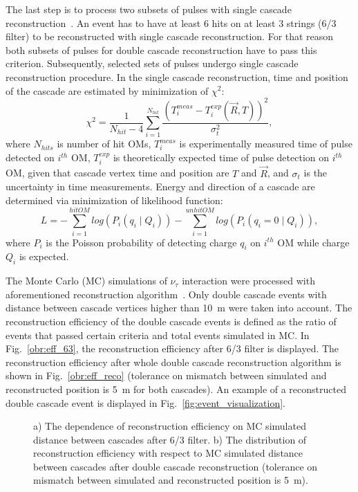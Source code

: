 \documentclass[a4paper,11pt]{article}
\begin{document}
The last step is to process two subsets of pulses with single cascade reconstruction~\cite{ICRC2019:cascades}. An event has to have at least 6 hits on at least 3 strings (6/3 filter) to be reconstructed with single cascade reconstruction. For that reason both subsets of pulses for double cascade reconstruction have to pass this criterion. Subsequently, selected sets of pulses undergo single cascade reconstruction procedure. In the single cascade reconstruction, time and position of the cascade are estimated by minimization of $\chi^{2}$:
\begin{equation}
\chi^2 = \frac{1}{N_{hit} - 4} \sum\limits_{i = 1}^{N_{hit}} \frac{ ( T_i^{meas} - T_i^{exp}(\vec{R},T))^2}{\sigma_t^2},
\label{eq:chi2}
\end{equation}
where $N_{hits}$ is number of hit OMs, $T_{i}^{meas}$ is experimentally measured time of pulse detected on $i^{th}$ OM, $T_{i}^{exp}$ is theoretically expected time of pulse detection on $i^{th}$ OM, given that cascade vertex time and position are $T$ and $\vec{R}$, and $\sigma_t$ is the uncertainty in time measurements. Energy and direction of a cascade are determined via minimization of likelihood function:
\begin{equation}
L =- \sum_{i=1}^{hit OM} log (P_{i}(q_{i} \mid Q_{i})) - \sum_{i = 1}^{unhitOM} log (P_{i}(q_{i} = 0 \mid Q_{i})),
\label{eq:likelihood}
\end{equation}
where $P_{i}$ is the Poisson probability of detecting charge $q_{i}$ on $i^{th}$ OM while charge $Q_{i}$ is expected. 

The Monte Carlo (MC) simulations of $\nu_{\tau}$ interaction were processed with aforementioned reconstruction algorithm~\cite{parallel}. Only double cascade events with distance between cascade vertices higher than 10~m were taken into account. 
The reconstruction efficiency of the double cascade events is defined as the ratio of events that passed certain criteria and total events simulated in MC. In Fig.~\ref{obr:eff_63}, the reconstruction efficiency after 6/3 filter is displayed. The reconstruction efficiency after whole double cascade reconstruction algorithm is shown in Fig.~\ref{obr:eff_reco} (tolerance on mismatch between simulated and reconstructed position is 5~m for both cascades). An example of a reconstructed double cascade event is displayed in Fig.~\ref{fig:event_visualization}. 


\begin{figure}[h!]
	\centering
	\begin{multicols}{2}
		\centering
	\end{multicols}
	\caption{a) The dependence of reconstruction efficiency on MC simulated distance between cascades after 6/3 filter. b) The distribution of reconstruction efficiency with respect to MC simulated distance between cascades after double cascade reconstruction (tolerance on mismatch between simulated and reconstructed position is 5~m).}
	\label{fig:eff_63_reco}
\end{figure} 
\end{document}
